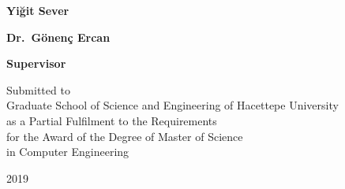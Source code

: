 \documentclass[
12pt, %
english, %
onehalfspacing, %
nolistspacing, %
parskip, %
headsepline, %
consistentlayout, %
]{MastersDoctoralThesis} %
\author{Yiğit \textsc{Sever}} %
\newcommand{\titletitlesize}{\fontsize{16pt}{18pt}\selectfont}
\begin{document}
\frontmatter %

\pagestyle{plain} %


\begin{titlepage}
\begin{center}
\vspace*{2\baselineskip} %
{\bfseries \titletitlesize{\ttitle}\par} %
\vspace*{3\baselineskip} %
{\bfseries \titletitlesize{Çift Dilli Kelime Temsilleri ile Sözlük Eşlenmesi}\par} %
\vspace*{3\baselineskip} %
{\bfseries Yiğit Sever\par}
\vspace*{3\baselineskip} %
{\bfseries Dr.~Gönenç Ercan\par} %
{\bfseries Supervisor}

\vspace*{3\baselineskip} %

Submitted to\\
Graduate School of Science and Engineering of Hacettepe University\\
as a Partial Fulfilment to the Requirements\\
for the Award of the Degree of Master of Science\\
in Computer Engineering

\vspace*{3\baselineskip} %

2019

\end{center}
\end{titlepage}

\end{document}
